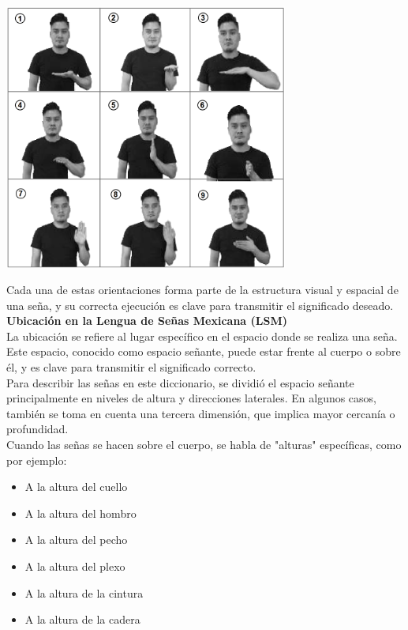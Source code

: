 \begin{center}
    \includegraphics[width=0.7\textwidth]{Images/Cap 2/Orientacion_Palma_Mano.png}
\end{center}

Cada una de estas orientaciones forma parte de la estructura visual y espacial de una seña, y su correcta ejecución es clave para transmitir el significado deseado.\\

\textbf{Ubicación en la Lengua de Señas Mexicana (LSM)}\\
La ubicación se refiere al lugar específico en el espacio donde se realiza una seña. Este espacio, conocido como espacio señante, puede estar frente al cuerpo o sobre él, y es clave para transmitir el significado correcto.\\

Para describir las señas en este diccionario, se dividió el espacio señante principalmente en niveles de altura y direcciones laterales. En algunos casos, también se toma en cuenta una tercera dimensión, que implica mayor cercanía o profundidad.\\

Cuando las señas se hacen sobre el cuerpo, se habla de "alturas" específicas, como por ejemplo:
\begin{itemize}
    \item A la altura del cuello
    \item A la altura del hombro
    \item A la altura del pecho
    \item A la altura del plexo
    \item A la altura de la cintura
    \item A la altura de la cadera
\end{itemize}


